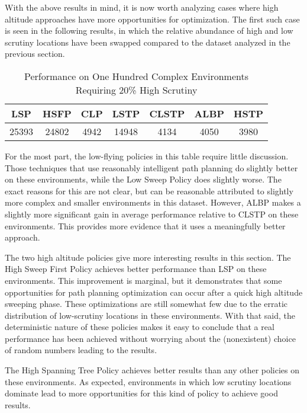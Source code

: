 With the above results in mind, it is now worth analyzing cases where high altitude approaches have more opportunities for optimization. The first such case is seen in the following results, in which the relative abundance of high and low scrutiny locations have been swapped compared to the dataset analyzed in the previous section.

\begin{table}[h]
\begin{center}
 \begin{tabular}{||c c c c c c c ||}
 \hline
 LSP   & HSFP  & CLP  & LSTP  & CLSTP & ALBP & HSTP \\
 \hline
 25393 & 24802 & 4942 & 14948 & 4134  & 4050 & 3980 \\
 \hline
 \end{tabular}
\end{center}
\caption{Performance on One Hundred Complex Environments Requiring 20\% High Scrutiny}
\end{table}

For the most part, the low-flying policies in this table require little discussion. Those techniques that use reasonably intelligent path planning do slightly better on these environments, while the Low Sweep Policy does slightly worse. The exact reasons for this are not clear, but can be reasonable attributed to slightly more complex and smaller environments in this dataset. However, ALBP makes a slightly more significant gain in average performance relative to CLSTP on these environments. This provides more evidence that it uses a meaningfully better approach.

The two high altitude policies give more interesting results in this section. The High Sweep First Policy achieves better performance than LSP on these environments. This improvement is marginal, but it demonstrates that some opportunities for path planning optimization can occur after a quick high altitude sweeping phase. These optimizations are still somewhat few due to the erratic distribution of low-scrutiny locations in these environments. With that said, the deterministic nature of these policies makes it easy to conclude that a real performance has been achieved without worrying about the (nonexistent) choice of random numbers leading to the results.

The High Spanning Tree Policy achieves better results than any other policies on these environments. As expected, environments in which low scrutiny locations dominate lead to more opportunities for this kind of policy to achieve good results.

